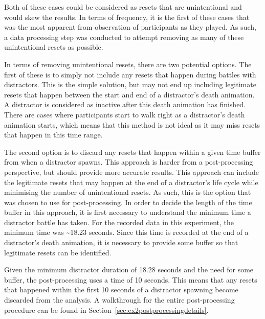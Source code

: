 Both of these cases could be considered as resets that are unintentional and would skew the results. In terms of frequency, it is the first of these cases that was the most apparent from observation of participants as they played. As such, a data processing step was conducted to attempt removing as many of these unintentional resets as possible. 

In terms of removing unintentional resets, there are two potential options. The first of these is to simply not include any resets that happen during battles with distractors. This is the simple solution, but may not end up including legitimate resets that happen between the start and end of a distractor's death animation. A distractor is considered as inactive after this death animation has finished. There are cases where participants start to walk right as a distractor's death animation starts, which means that this method is not ideal as it may miss resets that happen in this time range. 

The second option is to discard any resets that happen within a given time buffer from when a distractor spawns. This approach is harder from a post-processing perspective, but should provide more accurate results. This approach can include the legitimate resets that may happen at the end of a distractor's life cycle while minimising the number of unintentional resets. As such, this is the option that was chosen to use for post-processing. 
In order to decide the length of the time buffer in this approach, it is first necessary to understand the minimum time a distractor battle has taken. For the recorded data in this experiment, the minimum time was \textasciitilde18.23 seconds. Since this time is recorded at the end of a distractor's death animation, it is necessary to provide some buffer so that legitimate resets can be identified.

Given the minimum distractor duration of 18.28 seconds and the need for some buffer, the post-processing uses a time of 10 seconds. This means that any resets that happened within the first 10 seconds of a distractor spawning become discarded from the analysis. A walkthrough for the entire post-processing procedure can be found in Section~\ref{sec:ex2postprocessingdetails}.

